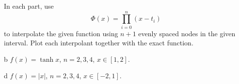 \begin{statement}{3}
  In each part, use
  \[
    \Phi(x) = \prod_{i = 0}^n (x - t_i)
  \]
  to interpolate the given function using $n + 1$ evenly spaced
  nodes in the given interval. Plot each interpolant together with the exact function.
\end{statement}

\begin{statement}{b}
  $f(x) = \tanh x$, $n = 2, 3, 4$, $x \in [1, 2]$.
\end{statement}

\begin{statement}{d}
  $f(x) = |x|$, $n = 2, 3, 4$, $x \in [-2, 1]$.
\end{statement}